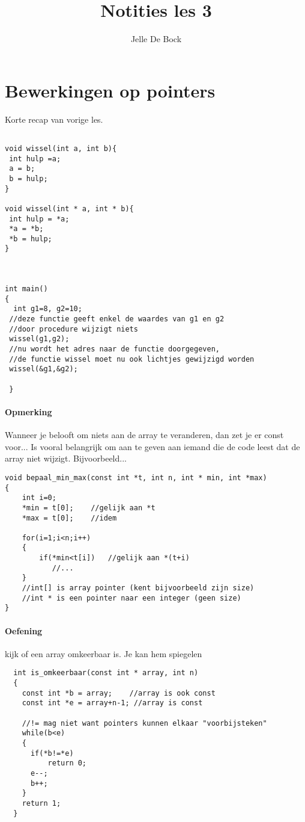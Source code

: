 \documentclass{article}
\title{Notities les 3}
\author{Jelle De Bock}
\begin{document}
\maketitle
\section{Bewerkingen op pointers}
Korte recap van vorige les.
\begin{lstlisting}

void wissel(int a, int b){
 int hulp =a;
 a = b;
 b = hulp;
}

void wissel(int * a, int * b){
 int hulp = *a;
 *a = *b;
 *b = hulp;
}



int main()
{
  int g1=8, g2=10;
 //deze functie geeft enkel de waardes van g1 en g2
 //door procedure wijzigt niets 
 wissel(g1,g2);
 //nu wordt het adres naar de functie doorgegeven, 
 //de functie wissel moet nu ook lichtjes gewijzigd worden
 wissel(&g1,&g2); 
 
 }
\end{lstlisting}
\paragraph{Opmerking}
Wanneer je belooft om niets aan de array te veranderen, dan zet je er const voor... \newline
Is vooral belangrijk om aan te geven aan iemand die de code leest dat de array niet wijzigt.
\newline Bijvoorbeeld...
\begin{lstlisting}
void bepaal_min_max(const int *t, int n, int * min, int *max)
{
    int i=0;
    *min = t[0];    //gelijk aan *t
    *max = t[0];    //idem

    for(i=1;i<n;i++)
    {
        if(*min<t[i])   //gelijk aan *(t+i)
           //...
    }
    //int[] is array pointer (kent bijvoorbeeld zijn size)
    //int * is een pointer naar een integer (geen size)
}
\end{lstlisting}
\paragraph{Oefening } kijk of een array omkeerbaar is. Je kan hem spiegelen
\begin{lstlisting}
  int is_omkeerbaar(const int * array, int n)
  {
    const int *b = array;    //array is ook const
    const int *e = array+n-1; //array is const
    
    //!= mag niet want pointers kunnen elkaar "voorbijsteken" 
    while(b<e)
    {
      if(*b!=*e)
          return 0;
      e--;
      b++;
    }
    return 1;
  }
\end{lstlisting}
\end{document}

